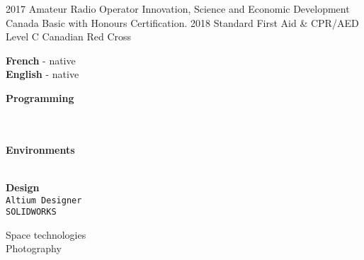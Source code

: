 \documentclass[9pt]{developercv} %
\begin{document}
\begin{minipage}[t]{0.8\textwidth}


\begin{entrylist}
	\entry
		{2017}
		{Amateur Radio Operator}
		{Innovation, Science and Economic Development Canada}
		{
			Basic with Honours Certification.
		}
	\entry
		{2018}
		{Standard First Aid \& CPR/AED Level C}
		{Canadian Red Cross}
		{\vspace{-14pt}}
\end{entrylist}
\end{minipage}
\begin{minipage}[t]{0.02\textwidth}
	\hfill
\end{minipage}
\begin{minipage}[t]{0.18\textwidth}
		\textbf{French} - native\\
		\textbf{English} - native

		\textbf{Programming}
		\begin{barchart}{1.75}
		\end{barchart}
		\\\\
		\textbf{Environments}
		\begin{barchart}{1.75}
		\end{barchart}
		\\
		\textbf{Design}\\
		\texttt{Altium Designer}\\
		\texttt{SOLIDWORKS}

		Space technologies\\
		Photography

\end{minipage}

\end{document}
